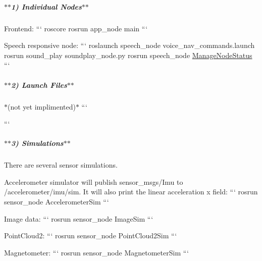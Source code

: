 \subparagraph*{$\ast$$\ast$1) Individual Nodes$\ast$$\ast$}

Frontend\-: ``` roscore rosrun app\-\_\-node main ```

Speech responsive node\-: ``` roslaunch speech\-\_\-node voice\-\_\-nav\-\_\-commands.\-launch rosrun sound\-\_\-play soundplay\-\_\-node.\-py rosrun speech\-\_\-node \hyperlink{class_manage_node_status}{Manage\-Node\-Status} ```

\subparagraph*{$\ast$$\ast$2) Launch Files$\ast$$\ast$}

$\ast$(not yet implimented)$\ast$ ```

```

\subparagraph*{$\ast$$\ast$3) Simulations$\ast$$\ast$}

There are several sensor simulations.

Accelerometer simulator will publish {\ttfamily sensor\-\_\-msgs/\-Imu} to {\ttfamily /accelerometer/imu/sim}. It will also print the linear acceleration x field\-: ``` rosrun sensor\-\_\-node Accelerometer\-Sim ```

Image data\-: ``` rosrun sensor\-\_\-node Image\-Sim ```

Point\-Cloud2\-: ``` rosrun sensor\-\_\-node Point\-Cloud2\-Sim ```

Magnetometer\-: ``` rosrun sensor\-\_\-node Magnetometer\-Sim ``` 